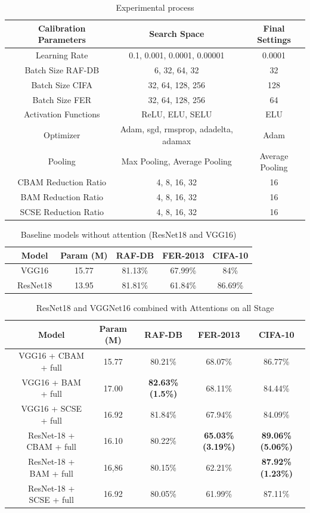 \documentclass[pdflatex,sn-mathphys-num]{sn-jnl}%
\theoremstyle{thmstyleone}%
\theoremstyle{thmstyletwo}%
\theoremstyle{thmstylethree}%
\begin{document}
\begin{table}[ht]
    \centering
    \caption{Experimental process}
    \label{tab1}
    \begin{tabular}{|c|c|c|c|}
    \hline
    \textbf{} & \textbf{Calibration Parameters} & \textbf{Search Space} & \textbf{Final Settings}  \\
    \hline
    & Learning Rate & 0.1, 0.001, 0.0001, 0.00001 & 0.0001 \\
    & Batch Size RAF-DB	 & 6, 32, 64, 32 & 32 \\
    & Batch Size CIFA & 32, 64, 128, 256 & 128 \\
    & Batch Size FER & 32, 64, 128, 256 & 64 \\
    & Activation Functions & ReLU, ELU, SELU & ELU \\
    & Optimizer & Adam, sgd, rmsprop, adadelta, adamax & Adam \\
    & Pooling & Max Pooling, Average Pooling & Average Pooling \\
    & CBAM Reduction Ratio & 4, 8, 16, 32 & 16 \\
    & BAM Reduction Ratio & 4, 8, 16, 32 & 16 \\
    & SCSE Reduction Ratio & 4, 8, 16, 32 & 16 \\
    \hline
    \end{tabular}
\end{table}
\begin{table}[ht]
    \centering
    \caption{Baseline models without attention (ResNet18 and VGG16)}
    \label{tab1}
    \begin{tabular}{|c|c|c|c|c|c|}
    \hline
    \textbf{} & \textbf{Model} & \textbf{Param (M)} & \textbf{RAF-DB} & \textbf{FER-2013}  & \textbf{CIFA-10}\\
    \hline
    & VGG16 & 15.77 & 81.13\% & 67.99\% & 84\% \\
    & ResNet18 & 13.95 &  81.81\% & 61.84\% & 86.69\% \\
    \hline
    \end{tabular}
\end{table}
\begin{table}[ht]
    \centering
    \caption{ResNet18 and VGGNet16 combined with Attentions on all Stage}
    \label{tab2}
    \begin{tabular}{|c|c|c|c|c|c|}
    \hline
    \textbf{} & \textbf{Model} & \textbf{Param (M)} & \textbf{RAF-DB} & \textbf{FER-2013}  & \textbf{CIFA-10}\\
    \hline
    & VGG16 + CBAM + full & 15.77 & 80.21\% & 68.07\% & 86.77\% \\
    & VGG16 + BAM + full & 17.00 & \textbf{82.63\%(1.5\%)} & 68.11\% & 84.44\% \\
    & VGG16 + SCSE + full & 16.92 & 81.84\% & 67.94\% & 84.09\% \\
    & ResNet-18 + CBAM + full & 16.10 & 80.22\% & \textbf{65.03\%(3.19\%)}  & \textbf{89.06\%(5.06\%) } \\
    & ResNet-18 + BAM + full & 16,86 & 80.15\% & 62.21\% & \textbf{87.92\%(1.23\%)} \\
    & ResNet-18 + SCSE + full & 16.92 & 80.05\% & 61.99\% & 87.11\% \\
    \hline
    \end{tabular}
\end{table}
\end{document}
